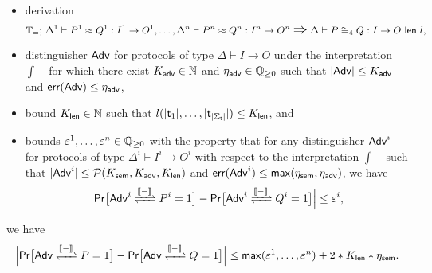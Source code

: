 \begin{lemma}
\begin{itemize}
\item derivation \[\mathbb{T}_=; \, \Delta^1 \vdash P^1 \approx Q^1 : I^1 \to O^1, \ldots, \Delta^n \vdash P^n \approx Q^n : I^n \to O^n \; \mathlarger{\mathlarger{\Rightarrow}} \; \Delta \vdash \lapproxcong{P}{Q}{I}{O}{l}{4},\]%

\item distinguisher $\mathsf{Adv}$ for protocols of type $\Delta \vdash I \to O$ under the interpretation $\int{-}$ for which there exist $K_{\mathsf{adv}} \in \mathbb{N}$ and $\eta_{\mathsf{adv}} \in \mathbb{Q}_{\geq 0}$ such that $|\mathsf{Adv}| \leq K_{\mathsf{adv}}$ and $\mathsf{err}(\mathsf{Adv}) \leq \eta_{\mathsf{adv}}$,

\item bound $K_{\mathsf{len}} \in \mathbb{N}$ such that $l(|\mathsf{t}_1|,\ldots,|\mathsf{t}_{|\Sigma_\mathsf{t}|}|) \leq K_{\mathsf{len}}$, and

\item bounds $\varepsilon^1,\ldots,\varepsilon^n \in \mathbb{Q}_{\geq 0}$ with the property that for any distinguisher $\mathsf{Adv}^i$ for protocols of type $\Delta^i \vdash I^i \to O^i$ with respect to the interpretation $\int{-}$ such that $|\mathsf{Adv}^i| \leq \mathcal{P}(K_{\mathsf{sem}},K_{\mathsf{adv}},K_{\mathsf{len}})$ and $\mathsf{err}(\mathsf{Adv}^i) \leq \mathsf{max}(\eta_{\mathsf{sem}},\eta_{\mathsf{adv}})$, we have
\[\Big|\mathsf{Pr}\big[\interaction{\Adv^i}{P^i}{\int{-}} = 1\big] - \mathsf{Pr}\big[\interaction{\Adv^i}{Q^i}{\int{-}} = 1\big]\Big| \leq \varepsilon^i,\]
\end{itemize}
we have
\[\Big|\mathsf{Pr}\big[\interaction{\Adv}{P}{\int{-}} = 1\big] - \mathsf{Pr}\big[\interaction{\Adv}{Q}{\int{-}} = 1\big]\Big| \leq \max(\varepsilon^1,\ldots,\varepsilon^n) + 2 * K_\length * \eta_\sem.\]
\end{lemma}

